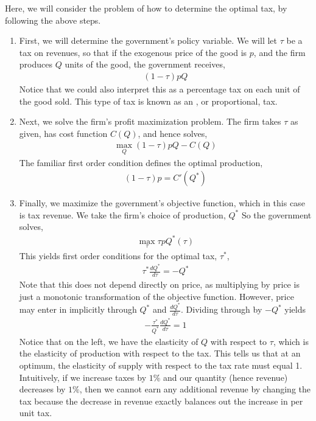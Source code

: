 Here, we will consider the problem of how to determine the optimal tax, by following the above steps.

\begin{enumerate}
    \item First, we will determine the government's policy variable. We will let $\tau$ be a tax on revenues, so that if the exogenous price of the good is $p$, and the firm produces $Q$ units of the good, the government receives,
    \begin{align*}
        (1 - \tau) p Q
    \end{align*}
    Notice that we could also interpret this as a percentage tax on each unit of the good sold. This type of tax is known as an , or proportional, tax. 
    \item Next, we solve the firm's profit maximization problem. The firm takes $\tau$ as given, has cost function $C(Q)$, and hence solves,
    \begin{align*}
        \max_{Q} (1 - \tau) p Q - C(Q)
    \end{align*}
    The familiar first order condition defines the optimal production,
    \begin{align*}
        (1 - \tau) p = C'(Q^*)
    \end{align*}
    \item Finally, we maximize the government's objective function, which in this case is tax revenue. We take the firm's choice of production, $Q^*$ So the government solves,
    \begin{align*}
        \max_{\tau} \tau p Q^*(\tau)
    \end{align*}
    This yields first order conditions for the optimal tax, $\tau^*$, 
    \begin{align*}
        \tau^* \frac{dQ^*}{d\tau} = -Q^*
    \end{align*}
    Note that this does not depend directly on price, as multiplying by price is just a monotonic transformation of the objective function. However, price may enter in implicitly through $Q^*$ and $\frac{dQ^*}{d\tau}$. Dividing through by $-Q^*$ yields
    \begin{align*}
        -\frac{\tau^*}{Q^*} \frac{dQ^*}{d\tau} = 1
    \end{align*}
    Notice that on the left, we have the elasticity of $Q$ with respect to $\tau$, which is the elasticity of production with respect to the tax. This tells us that at an optimum, the elasticity of supply with respect to the tax rate must equal 1. Intuitively, if we increase taxes by $1\%$ and our quantity (hence revenue) decreases by $1\%$, then we cannot earn any additional revenue by changing the tax because the decrease in revenue exactly balances out the increase in per unit tax. 
\end{enumerate}